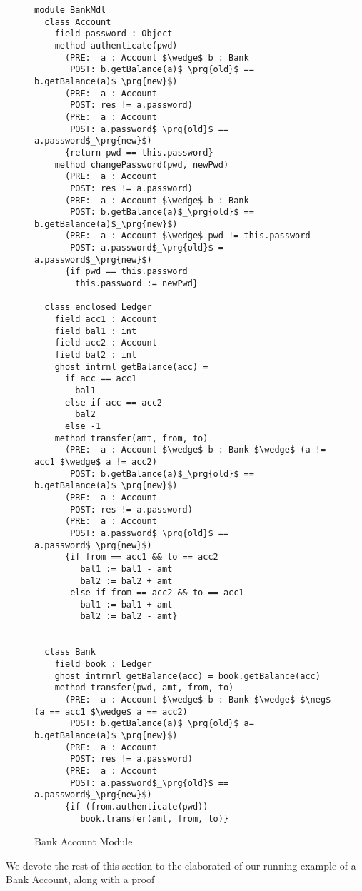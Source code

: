 \begin{figure}[t]
\begin{lstlisting}[mathescape=true, frame=lines, language=chainmail]
module BankMdl
  class Account
    field password : Object
    method authenticate(pwd)
      (PRE:  a : Account $\wedge$ b : Bank
       POST: b.getBalance(a)$_\prg{old}$ == b.getBalance(a)$_\prg{new}$)
      (PRE:  a : Account
       POST: res != a.password)
      (PRE:  a : Account
       POST: a.password$_\prg{old}$ == a.password$_\prg{new}$)
      {return pwd == this.password}
    method changePassword(pwd, newPwd)
      (PRE:  a : Account
       POST: res != a.password)
      (PRE:  a : Account $\wedge$ b : Bank
       POST: b.getBalance(a)$_\prg{old}$ == b.getBalance(a)$_\prg{new}$)
      (PRE:  a : Account $\wedge$ pwd != this.password
       POST: a.password$_\prg{old}$ = a.password$_\prg{new}$)
      {if pwd == this.password
        this.password := newPwd}

  class enclosed Ledger
    field acc1 : Account
    field bal1 : int
    field acc2 : Account
    field bal2 : int
    ghost intrnl getBalance(acc) = 
      if acc == acc1
        bal1
      else if acc == acc2
        bal2
      else -1
    method transfer(amt, from, to)
      (PRE:  a : Account $\wedge$ b : Bank $\wedge$ (a != acc1 $\wedge$ a != acc2)
       POST: b.getBalance(a)$_\prg{old}$ == b.getBalance(a)$_\prg{new}$)
      (PRE:  a : Account
       POST: res != a.password)
      (PRE:  a : Account
       POST: a.password$_\prg{old}$ == a.password$_\prg{new}$)
      {if from == acc1 && to == acc2
         bal1 := bal1 - amt
         bal2 := bal2 + amt
       else if from == acc2 && to == acc1
         bal1 := bal1 + amt
         bal2 := bal2 - amt}
      

  class Bank
    field book : Ledger
    ghost intrnrl getBalance(acc) = book.getBalance(acc)
    method transfer(pwd, amt, from, to)
      (PRE:  a : Account $\wedge$ b : Bank $\wedge$ $\neg$ (a == acc1 $\wedge$ a == acc2)
       POST: b.getBalance(a)$_\prg{old}$ a= b.getBalance(a)$_\prg{new}$)
      (PRE:  a : Account
       POST: res != a.password)
      (PRE:  a : Account
       POST: a.password$_\prg{old}$ == a.password$_\prg{new}$)
      {if (from.authenticate(pwd))
         book.transfer(amt, from, to)}
\end{lstlisting}
\caption{Bank Account Module}
\label{f:ex-bank}
\end{figure}
We devote the rest of this section to the elaborated  of our
running example of a Bank Account, along with a proof 
